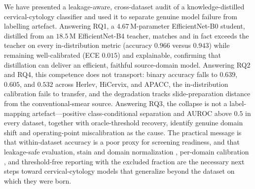 \documentclass[twocolumn]{article}
\begin{document}
We have presented a leakage-aware, cross-dataset audit of a knowledge-distilled cervical-cytology classifier and used it to separate genuine model failure from labelling artefact. Answering RQ1, a $4.67$\,M-parameter EfficientNet-B0 student, distilled from an $18.5$\,M EfficientNet-B4 teacher, matches and in fact exceeds the teacher on every in-distribution metric (accuracy $0.966$ versus $0.943$) while remaining well-calibrated (ECE $0.015$) and explainable, confirming that distillation can deliver an efficient, faithful source-domain model. Answering RQ2 and RQ4, this competence does not transport: binary accuracy falls to $0.639$, $0.605$, and $0.532$ across Herlev, HiCervix, and APACC, the in-distribution calibration fails to transfer, and the degradation tracks slide-preparation distance from the conventional-smear source. Answering RQ3, the collapse is not a label-mapping artefact---positive class-conditional separation and AUROC above $0.5$ in every dataset, together with oracle-threshold recovery, identify genuine domain shift and operating-point miscalibration as the cause. The practical message is that within-dataset accuracy is a poor proxy for screening readiness, and that leakage-safe evaluation, stain and domain normalization \citep{macenko2009stain}, per-domain calibration \citep{guo2017calibration}, and threshold-free reporting with the excluded fraction are the necessary next steps toward cervical-cytology models that generalize beyond the dataset on which they were born.




\end{document}
